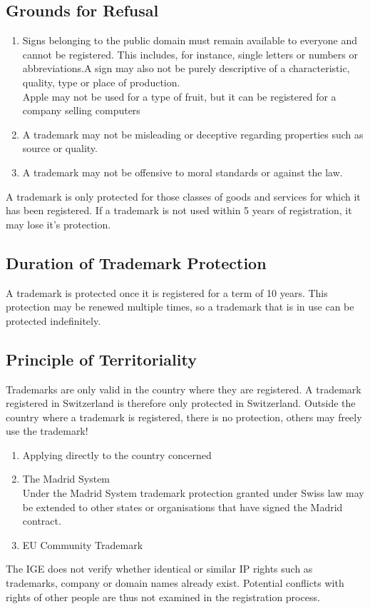 \documentclass[11pt]{article}
\theoremstyle{definition}
\begin{document}
\subsection{Grounds for Refusal}
\begin{enumerate}
	\item Signs belonging to the public domain must remain available to everyone and cannot be registered. This includes, for instance, single letters or numbers or abbreviations.A sign may also not be purely descriptive of a characteristic, quality, type or place of production.\\
	Apple may not be used for a type of fruit, but it can be registered for a company selling computers
	\item A trademark may not be misleading or deceptive regarding properties such as source or quality.
	\item A trademark may not be offensive to moral standards or against the law.
\end{enumerate}

A trademark is only protected for those classes of goods and services for which it has been registered. If a trademark is not used within 5 years of registration, it may lose it's protection.

\subsection{Duration of Trademark Protection}
A trademark is protected once it is registered for a term of 10 years. This protection may be renewed multiple times, so a trademark that is in use can be protected indefinitely.

\subsection{Principle of Territoriality}
Trademarks are only valid in the country where they are registered. A trademark registered in Switzerland is therefore only protected in Switzerland. Outside the country where a trademark is registered, there is no protection, others may freely use the trademark!

\begin{enumerate}
	\item Applying directly to the country concerned
	\item The Madrid System\\
	Under the Madrid System trademark protection granted under Swiss law may be extended to other states or organisations that have signed the Madrid contract.
	\item EU Community Trademark
\end{enumerate}
The IGE does not verify whether identical or similar IP rights such as trademarks, company or domain names already exist. Potential conflicts with rights of other people are thus not examined in the registration process.
\end{document}
